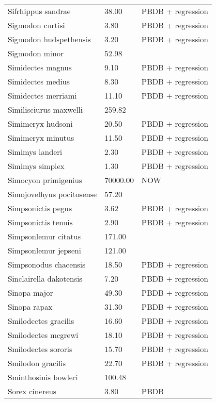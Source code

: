 \documentclass{article}
\begin{document}
\begin{center}
\begin{longtable}{p{} p{} p{}}
    Sifrhippus sandrae & 38.00 & PBDB + regression \\ 
    Sigmodon curtisi & 3.80 & PBDB + regression \\ 
    Sigmodon hudspethensis & 3.20 & PBDB + regression \\ 
    Sigmodon minor & 52.98 & \cite{Tomiya2013} \\ 
    Simidectes magnus & 9.10 & PBDB + regression \\ 
    Simidectes medius & 8.30 & PBDB + regression \\ 
    Simidectes merriami & 11.10 & PBDB + regression \\ 
    Similisciurus maxwelli & 259.82 & \cite{Tomiya2013} \\ 
    Simimeryx hudsoni & 20.50 & PBDB + regression \\ 
    Simimeryx minutus & 11.50 & PBDB + regression \\ 
    Simimys landeri & 2.30 & PBDB + regression \\ 
    Simimys simplex & 1.30 & PBDB + regression \\ 
    Simocyon primigenius & 70000.00 & NOW \\ 
    Simojovelhyus pocitosense & 57.20 & \cite{Wang1999} \\ 
    Simpsonictis pegus & 3.62 & PBDB + regression \\ 
    Simpsonictis tenuis & 2.90 & PBDB + regression \\ 
    Simpsonlemur citatus & 171.00 & \cite{Soligo2006} \\ 
    Simpsonlemur jepseni & 121.00 & \cite{Soligo2006} \\ 
    Simpsonodus chacensis & 18.50 & PBDB + regression \\ 
    Sinclairella dakotensis & 7.20 & PBDB + regression \\ 
    Sinopa major & 49.30 & PBDB + regression \\ 
    Sinopa rapax & 31.30 & PBDB + regression \\ 
    Smilodectes gracilis & 16.60 & PBDB + regression \\ 
    Smilodectes mcgrewi & 18.10 & PBDB + regression \\ 
    Smilodectes sororis & 15.70 & PBDB + regression \\ 
    Smilodon gracilis & 22.70 & PBDB + regression \\ 
    Sminthosinis bowleri & 100.48 & \cite{Tomiya2013} \\ 
    Sorex cinereus & 3.80 & PBDB \\ 

\end{longtable}
\end{center}
\end{document}
